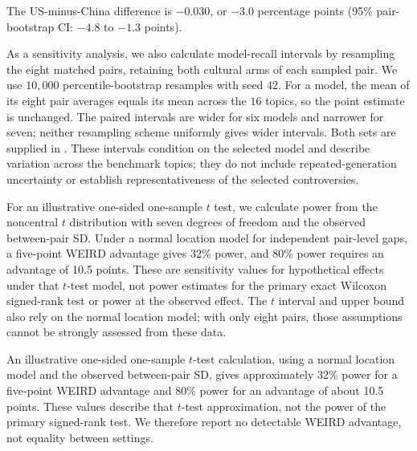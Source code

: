 The US-minus-China difference is $-0.030$, or $-3.0$ percentage points (95\% pair-bootstrap CI: $-4.8$ to $-1.3$ points).

As a sensitivity analysis, we also calculate model-recall intervals by resampling the eight matched pairs, retaining both cultural arms of each sampled pair. We use $10{,}000$ percentile-bootstrap resamples with seed $42$. For a model, the mean of its eight pair averages equals its mean across the $16$ topics, so the point estimate is unchanged. The paired intervals are wider for six models and narrower for seven; neither resampling scheme uniformly gives wider intervals. Both sets are supplied in . These intervals condition on the selected model and describe variation across the benchmark topics; they do not include repeated-generation uncertainty or establish representativeness of the selected controversies.

For an illustrative one-sided one-sample $t$ test, we calculate power from the noncentral $t$ distribution with seven degrees of freedom and the observed between-pair SD. Under a normal location model for independent pair-level gaps, a five-point WEIRD advantage gives 32\% power, and 80\% power requires an advantage of 10.5 points. These are sensitivity values for hypothetical effects under that $t$-test model, not power estimates for the primary exact Wilcoxon signed-rank test or power at the observed effect. The $t$ interval and upper bound also rely on the normal location model; with only eight pairs, those assumptions cannot be strongly assessed from these data.

An illustrative one-sided one-sample $t$-test calculation, using a normal location model and the observed between-pair SD, gives approximately 32\% power for a five-point WEIRD advantage and 80\% power for an advantage of about 10.5 points. These values describe that $t$-test approximation, not the power of the primary signed-rank test. We therefore report no detectable WEIRD advantage, not equality between settings.
